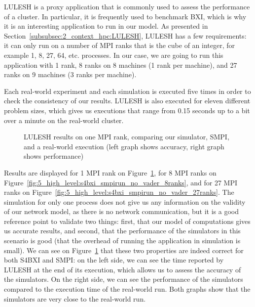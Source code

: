 LULESH is a proxy application that is commonly used to assess the performance of
a cluster. In particular, it is frequently used to benchmark BXI, which is why
it is an interesting application to run in our model. As presented in
Section~\ref{subsubsec:2_context_hpc:LULESH}, LULESH has a few requirements: it
can only run on a number of MPI ranks that is the cube of an integer, for
example 1, 8, 27, 64, etc. processes. In our case, we are going to run this
application with 1 rank, 8 ranks on 8 machines (1 rank per machine), and 27
ranks on 9 machines (3 ranks per machine).

Each real-world experiment and each simulation is executed five times in order
to check the consistency of our results. LULESH is also executed for eleven
different problem sizes, which gives us executions that range from 0.15 seconds
up to a bit over a minute on the real-world cluster.

\begin{figure}[!ht]
    \centering
    \caption{LULESH results on one MPI rank, comparing our simulator, SMPI, and a real-world execution (left graph shows accuracy, right graph shows performance)}
    \label{fig:5_high_level:s4bxi_smpirun_no_vader_1rank}
\end{figure}

Results are displayed for 1 MPI rank on
Figure~\ref{fig:5_high_level:s4bxi_smpirun_no_vader_1rank}, for 8 MPI ranks on
Figure~\ref{fig:5_high_level:s4bxi_smpirun_no_vader_8ranks}, and for 27 MPI
ranks on Figure~\ref{fig:5_high_level:s4bxi_smpirun_no_vader_27ranks}. The
simulation for only one process does not give us any information on the validity
of our network model, as there is no network communication, but it is a good
reference point to validate two things: first, that our model of computations
gives us accurate results, and second, that the performance of the simulators in
this scenario is good (that the overhead of running the application in
simulation is small). We can see on
Figure~\ref{fig:5_high_level:s4bxi_smpirun_no_vader_1rank} that these two
properties are indeed correct for both S4BXI and SMPI: on the left side, we can
see the time reported by LULESH at the end of its execution, which allows us to
assess the accuracy of the simulators. On the right side, we can see the
performance of the simulators compared to the execution time of the real-world
run. Both graphs show that the simulators are very close to the
real-world run.

